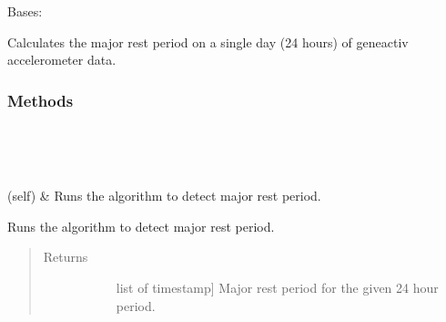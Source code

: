 \documentclass[letterpaper,10pt,english]{sphinxmanual}
\begin{document}
\begin{fulllineitems}
\label{\detokenize{index:sleeppy.majorrest.MajorRestPeriod}}
Bases: 

Calculates the major rest period on a single day (24 hours) of geneactiv accelerometer data.
\subsubsection*{Methods}


\begin{savenotes}\sphinxatlongtablestart\begin{longtable}[c]{}
\hline

\endfirsthead

%
{}\\
\hline

\endhead

\hline
{}\\
\endfoot

\endlastfoot

{\hyperref[\detokenize{index:sleeppy.majorrest.MajorRestPeriod.run}]{}}(self)
&
Runs the algorithm to detect major rest period.
\\
\hline
\end{longtable}\sphinxatlongtableend\end{savenotes}

\begin{fulllineitems}
\label{\detokenize{index:sleeppy.majorrest.MajorRestPeriod.run}}
Runs the algorithm to detect major rest period.
\begin{quote}\begin{description}
\item[{Returns}] \leavevmode\begin{description}
\item[{}] \leavevmode{[}list of timestamp{]}
Major rest period for the given 24 hour period.

\end{description}

\end{description}\end{quote}

\end{fulllineitems}


\end{fulllineitems}
\end{document}
